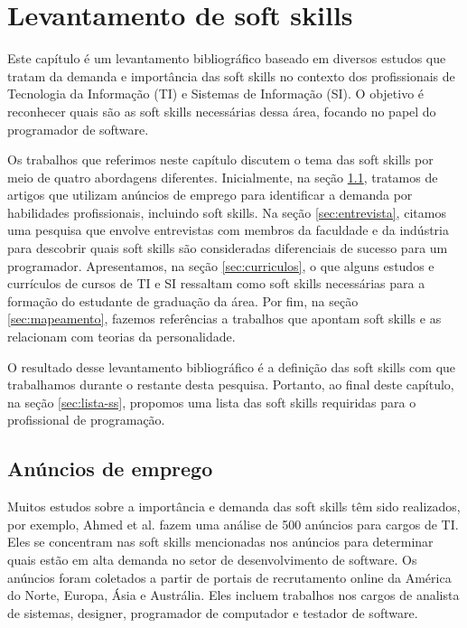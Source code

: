 

\chapter{Levantamento de soft skills}

\label{chap:research}

Este capítulo é um levantamento bibliográfico baseado em diversos estudos que tratam da demanda e importância das soft skills no contexto dos profissionais de Tecnologia da Informação (TI) e Sistemas de Informação (SI). O objetivo é reconhecer quais são as soft skills necessárias dessa área, focando no papel do programador de software.

Os trabalhos que referimos neste capítulo discutem o tema das soft skills por meio de quatro abordagens diferentes. 
Inicialmente, na seção \ref{sec:anuncios}, tratamos de artigos que utilizam anúncios de emprego para identificar a demanda por habilidades profissionais, incluindo soft skills. Na seção \ref{sec:entrevista}, citamos uma pesquisa que envolve entrevistas com membros da faculdade e da indústria para descobrir quais soft skills são consideradas diferenciais de sucesso para um programador. Apresentamos, na seção \ref{sec:curriculos}, o que alguns estudos e currículos de cursos de TI e SI ressaltam como soft skills necessárias para a formação do estudante de graduação da área. Por fim, na seção \ref{sec:mapeamento}, fazemos referências a trabalhos que apontam soft skills e as relacionam com teorias da personalidade.

O resultado desse levantamento bibliográfico é a definição das soft skills com que trabalhamos durante o restante desta pesquisa. Portanto, ao final deste capítulo, na seção \ref{sec:lista-ss}, propomos uma lista das soft skills requiridas para o profissional de programação.

\section{Anúncios de emprego}
\label{sec:anuncios}

Muitos estudos sobre a importância e demanda das soft skills têm sido realizados, por exemplo, Ahmed et al. \cite{ahmed:12} fazem uma análise de 500 anúncios para cargos de TI. Eles se concentram nas soft skills mencionadas nos anúncios para determinar quais estão em alta demanda no setor de desenvolvimento de software. Os anúncios foram coletados a partir de portais de recrutamento online da América do Norte, Europa, Ásia e Austrália. Eles incluem trabalhos nos cargos de analista de sistemas, designer, programador de computador e testador de software.

